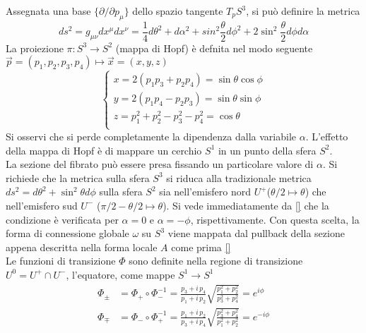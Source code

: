 Assegnata una base $ \{ \partial/\partial p_\mu \} $ dello spazio tangente
$T_p S^3$, si può definire la metrica
\begin{equation}
   d s^2 = g_{\mu\nu} dx^\mu dx^\nu
         = \frac{1}{4} d\theta^2 + d\alpha^2 + sin^2\frac{\theta}{2}d\phi^2
         + 2\sin^2\frac{\theta}{2} d\phi d\alpha
\end{equation}
La proiezione $\pi : S^3 \to S^2$ (mappa di Hopf) è defnita nel modo seguente
$\vec p = (p_1,p_2,p_3,p_4) \mapsto \vec x = (x,y,z)$
\begin{equation}\label{eq:hopfmap}
   \begin{cases}
      x = 2(p_1 p_3 + p_2 p_4)          = \sin\theta \cos\phi \\
      y = 2(p_1 p_4 - p_2 p_3)          = \sin\theta \sin\phi \\
      z = p_1^2 + p_2^2 - p_3^2 - p_4^2 = \cos\theta          \\
   \end{cases}
\end{equation}
Si osservi che si perde completamente la dipendenza dalla variabile $\alpha$.
L'effetto della mappa di Hopf è di mappare un cerchio $S^1$ in un punto
della sfera $S^2$.\\

La sezione del fibrato può essere presa fissando un particolare valore di $\alpha$.
Si richiede che la metrica sulla sfera $S^3$ si riduca alla tradizionale metrica
$ds^2 = d\theta^2 + \sin^2\theta d\phi$ sulla sfera $S^2$ sia nell'emisfero
nord $U^+$($ \theta/2 \mapsto \theta $) che nell'emisfero sud $U^-$
($\pi/2 - \theta/2 \mapsto \theta $). Si vede immediatamente da \ref{} che la
condizione è verificata per $\alpha = 0$ e $\alpha = -\phi$, rispettivamente.
Con questa scelta, la forma di connessione globale $\omega$ su $S^3$
viene mappata dal pullback della sezione appena descritta nella forma locale $A$
come prima \ref{}\\

Le funzioni di transizione $\Phi$ sono definite nella regione di transizione
$U^0 = U^+ \cap U^-$, l'equatore, come mappe $S^1 \to S^1$
\begin{equation}
   \begin{aligned}
  \Phi_\pm & = \Phi_+ \circ \Phi_- ^{-1}
             = \frac{p_3 +  i \, p_4}{p_1 + i \, p_2}
                \sqrt{ \frac{p_1^2 + p_2^2}{p_3^2 + p_4^2} }
             = e^{i\phi} \\
  \Phi_\mp & = \Phi_- \circ \Phi_+ ^{-1}
             = \frac{p_1 + i \, p_2}{p_3 +  i \, p_4}
                  \sqrt{ \frac{p_3^2 + p_4^2}{p_1^2 + p_2^2}}
             = e^{-i\phi}
   \end{aligned}
\end{equation}


